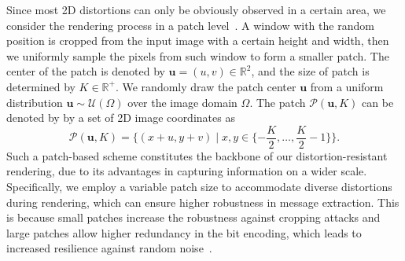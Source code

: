 \documentclass[10pt,twocolumn,letterpaper]{article}
\begin{document}
Since most 2D distortions can only be obviously observed in a certain area, we consider the rendering process in a patch level~\cite{kwon2003watermarking, cotting2004robust}. A window with the random position is cropped from the input image with a certain height and width, then we uniformly sample the pixels from such window to form a smaller patch. The center of the patch is denoted by $\mathbf{u}=(u, v) \in \mathbb{R}^2$, and the size of patch is determined by $K\in \mathbb{R}^{+}$. We randomly draw the patch center $\mathbf{u}$ from a uniform distribution $\mathbf{u} \sim \mathcal{U}(\Omega)$ over the image domain $\Omega$. The patch $\mathcal{P}(\mathbf{u}, K)$ can be denoted by by a set of 2D image coordinates as
\begin{equation}
\mathcal{P}(\mathbf{u}, K)=\{(x+u, y+v) \mid x, y \in\{-\frac{K}{2}, \ldots, \frac{K}{2}-1\}\}.
\end{equation}
Such a patch-based scheme constitutes the backbone of our distortion-resistant rendering, due to its advantages in capturing information on a wider scale. Specifically, we employ a variable patch size to accommodate diverse distortions during rendering, which can ensure higher robustness in message extraction. This is because small patches increase the robustness against cropping attacks and large patches allow higher redundancy in the bit encoding, which leads to increased resilience against random noise~\cite{cotting2004robust}.







\end{document}
